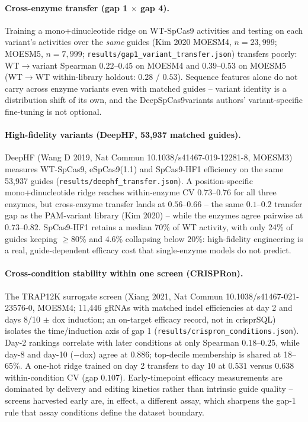 \documentclass[12pt]{article}
\begin{document}
\paragraph{Cross-enzyme transfer (gap 1 $\times$ gap 4).} Training a
mono+dinucleotide ridge on WT-SpCas9 activities and testing on each
variant's activities over the \emph{same} guides (Kim 2020 MOESM4,
$n=23{,}999$; MOESM5, $n=7{,}999$;
\texttt{results/gap1\_variant\_transfer.json}) transfers poorly:
WT$\to$variant Spearman $0.22$--$0.45$ on MOESM4 and $0.39$--$0.53$ on
MOESM5 (WT$\to$WT within-library holdout: $0.28$ / $0.53$). Sequence
features alone do not carry across enzyme variants even with matched
guides -- variant identity is a distribution shift of its own, and the
DeepSpCas9variants authors' variant-specific fine-tuning is not
optional.
\paragraph{High-fidelity variants (DeepHF, 53,937 matched guides).}
DeepHF (Wang D 2019, Nat Commun 10.1038/s41467-019-12281-8, MOESM3)
measures WT-SpCas9, eSpCas9(1.1) and SpCas9-HF1 efficiency on the same
53,937 guides (\texttt{results/deephf\_transfer.json}). A
position-specific mono+dinucleotide ridge reaches within-enzyme CV
$0.73$--$0.76$ for all three enzymes, but cross-enzyme transfer lands at
$0.56$--$0.66$ -- the same $0.1$--$0.2$ transfer gap as the
PAM-variant library (Kim 2020) -- while the enzymes agree pairwise at
$0.73$--$0.82$. SpCas9-HF1 retains a median 70\% of WT activity, with
only 24\% of guides keeping $\ge$80\% and 4.6\% collapsing below 20\%:
high-fidelity engineering is a real, guide-dependent efficacy cost that
single-enzyme models do not predict.
\paragraph{Cross-condition stability within one screen (CRISPRon).}
The TRAP12K surrogate screen (Xiang 2021, Nat Commun
10.1038/s41467-021-23576-0, MOESM4; 11,446 gRNAs with matched indel
efficiencies at day 2 and days 8/10 $\pm$ dox induction; an on-target
efficacy record, not in crisprSQL) isolates the time/induction axis of
gap 1 (\texttt{results/crispron\_conditions.json}). Day-2 rankings
correlate with later conditions at only Spearman $0.18$--$0.25$, while
day-8 and day-10 ($-$dox) agree at $0.886$; top-decile membership is
shared at 18--65\%. A one-hot ridge trained on day 2 transfers to day
10 at $0.531$ versus $0.638$ within-condition CV (gap $0.107$).
Early-timepoint efficacy measurements are dominated by delivery and
editing kinetics rather than intrinsic guide quality -- screens
harvested early are, in effect, a different assay, which sharpens the
gap-1 rule that assay conditions define the dataset boundary.
\end{document}
